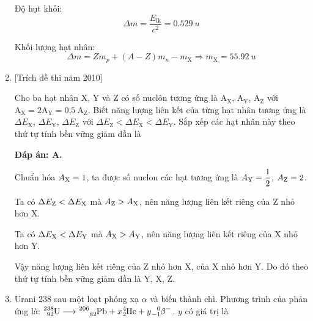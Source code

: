 \begin{enumerate}[label=\bfseries Câu \arabic*:]
{		Độ hụt khối:
		$$\Delta m = \dfrac{E_{\text{lk}}}{c^2} = \SI{0.529}{u}$$
		
		Khối lượng hạt nhân:
		$$\Delta m = Z m_p + (A-Z) m_n - m_{\text{X}} \Rightarrow m_{\text{X}} = \SI{55.92}{u}$$
		
	}
	
	
	\item {} [Trích đề thi năm 2010]
	
	\cauhoi
	{Cho ba hạt nhân X, Y và Z có số nuclôn tương ứng là $\text{A}_{\text{X}}$, $\text{A}_{\text{Y}}$, $\text{A}_{\text{Z}}$ với $\text{A}_{\text{X}} = 2\text{A}_{\text{Y}} = \text{0,5}\ \text{A}_{\text{Z}}$. Biết năng lượng liên kết của từng hạt nhân tương ứng là $\Delta E_{\text{X}}$, $\Delta E_{\text{Y}}$, $\Delta E_{\text{Z}}$ với $\Delta E_{\text{Z}} < \Delta E_{\text{X}} < \Delta E_{\text{Y}}$. Sắp xếp các hạt nhân này theo thứ tự tính bền vững giảm dần là
	}
	
	\loigiai
	{		\textbf{Đáp án: A.}
		
		Chuẩn hóa $A_{\ce{X}} = 1$, ta được số nuclon các hạt tương ứng là $A_{\ce{Y}} = \dfrac{1}{2}$, $A_{\ce{Z}} = 2$.
		
		Ta có $\Delta E_{\ce{Z}} < \Delta E_{\ce{X}}$ mà $A_{\ce{Z}} > A_{\ce{X}}$, nên năng lượng liên kết riêng của Z nhỏ hơn X.
		
		
		Ta có $\Delta E_{\ce{X}} < \Delta E_{\ce{Y}}$ mà $A_{\ce{X}} > A_{\ce{Y}}$, nên năng lượng liên kết riêng của X nhỏ hơn Y.
		
		Vậy năng lượng liên kết riêng của Z nhỏ hơn X, của X nhỏ hơn Y. Do đó theo thứ tự tính bền vững giảm dần là Y, X, Z.
	}
	
	
	
	
	
	\item {}
	
	\cauhoi
	{Urani 238 sau một loạt phóng xạ $\alpha$ và biến thành chì. Phương trình của phản ứng là: $\ce{^{238}_{92} U} \longrightarrow \ce{^{206} _{82} Pb} + x \ce{^4_2 He} + y \ce{^0_{-1} \beta^{-}}$. $y$ có giá trị là
	}
	

\end{enumerate}
